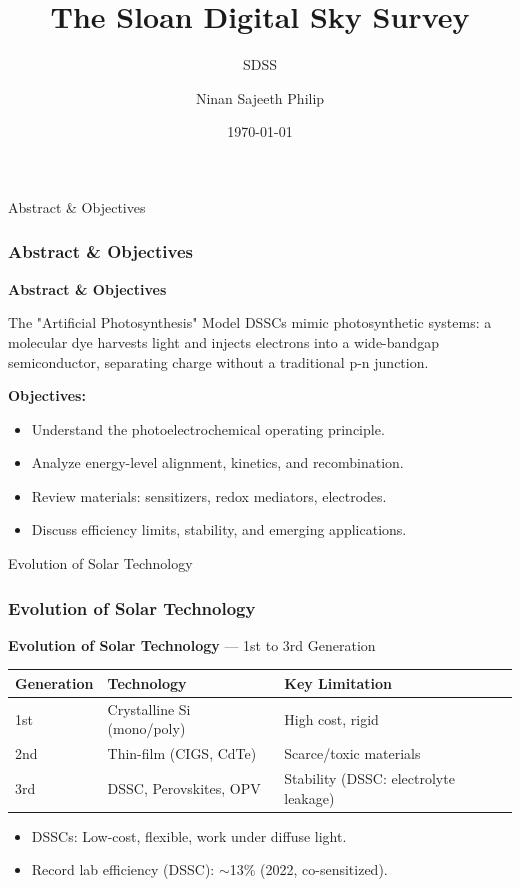 \documentclass[aspectratio=169]{beamer}
\title{The Sloan Digital Sky Survey}
\subtitle{SDSS}
\author{Ninan Sajeeth Philip}
\institute{\textcolor{mygreen}{Artificial Intelligence Research and Intelligent Systems (airis4D)}}
\date{\today}
\begin{document}
\begin{frame}[plain]
\titlepage
\end{frame}

\begin{frame}{Abstract \& Objectives}
\frametitle{Abstract \& Objectives}

\textbf{Abstract \& Objectives}
\begin{block}{The "Artificial Photosynthesis" Model}
DSSCs mimic photosynthetic systems: a molecular dye harvests light and injects electrons into a wide-bandgap semiconductor, separating charge without a traditional p-n junction.
\end{block}
\textbf{Objectives:}
\begin{itemize}
\item Understand the photoelectrochemical operating principle.
\item Analyze energy-level alignment, kinetics, and recombination.
\item Review materials: sensitizers, redox mediators, electrodes.
\item Discuss efficiency limits, stability, and emerging applications.
\end{itemize}
\vspace{2mm}
\cite{Grätzel2001, Hagfeldt2010}
\end{frame}


\begin{frame}{Evolution of Solar Technology}
\frametitle{Evolution of Solar Technology}

\textbf{Evolution of Solar Technology} — 1st to 3rd Generation
\begin{table}
\centering
\begin{tabular}{lll}
\toprule
Generation & Technology & Key Limitation \\
\midrule
1st & Crystalline Si (mono/poly) & High cost, rigid \\
2nd & Thin-film (CIGS, CdTe) & Scarce/toxic materials \\
3rd & DSSC, Perovskites, OPV & Stability (DSSC: electrolyte leakage) \\
\bottomrule
\end{tabular}
\end{table}
\begin{itemize}
\item DSSCs: Low-cost, flexible, work under diffuse light.
\item Record lab efficiency (DSSC): $\sim$13\% (2022, co-sensitized).
\end{itemize}
\cite{Green2022}
\end{frame}
\end{document}
